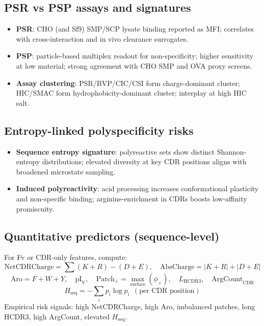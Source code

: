 \subsection*{PSR vs PSP assays and signatures}
\begin{itemize}\setlength\itemsep{2pt}
\item \textbf{PSR}: CHO (and Sf9) SMP/SCP lysate binding reported as MFI; correlates with cross-interaction and in vivo clearance surrogates.
\item \textbf{PSP}: particle-based multiplex readout for non-specificity; higher sensitivity at low material; strong agreement with CHO SMP and OVA proxy screens.
\item \textbf{Assay clustering}: PSR/BVP/CIC/CSI form charge-dominant cluster; HIC/SMAC form hydrophobicity-dominant cluster; interplay at high HIC salt.
\end{itemize}

\subsection*{Entropy-linked polyspecificity risks}
\begin{itemize}\setlength\itemsep{2pt}
\item \textbf{Sequence entropy signature}: polyreactive sets show distinct Shannon-entropy distributions; elevated diversity at key CDR positions aligns with broadened microstate sampling.
\item \textbf{Induced polyreactivity}: acid processing increases conformational plasticity and non-specific binding; arginine-enrichment in CDRs boosts low-affinity promiscuity.
\end{itemize}

\subsection*{Quantitative predictors (sequence-level)}
For Fv or CDR-only features, compute:
\[
\text{NetCDRCharge} = \sum (K+R) - (D+E),\quad \text{AbsCharge} = |K+R| + |D+E|
\]
\[
\text{Aro} = F+W+Y,\quad \text{pI}_{\mathrm{V}},\quad \text{Patch}_{+}=\max\limits_{\text{surface}}(\phi_{+}),\quad L_{\mathrm{HCDR3}},\quad \text{ArgCount}_{\mathrm{CDR}}
\]
\[
H_{\mathrm{seq}} = -\sum_{i} p_{i}\log p_{i}\ \ (\text{per CDR position})
\]
Empirical risk signals: high NetCDRCharge, high Aro, imbalanced patches, long HCDR3, high ArgCount, elevated $H_{\mathrm{seq}}$.

